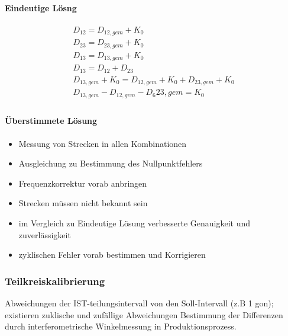 \documentclass[12pt]{article}
\begin{document}
\paragraph{Eindeutige Lösng}
\begin{gather*}
	D_{12} = D_{12,gem} + K_0 \\
	D_{23} = D_{23,gem} + K_0 \\
	D_{13} = D_{13,gem} + K_0 \\
	D_{13} = D_{12} + D_{23} \\
	D_{13,gem} + K_0 = D_{12,gem} + K_0 + D_{23,gem} + K_0 \\
	D_{13,gem} - D_{12,gem} - D_6{23,gem} = K_0 \\
\end{gather*}
\paragraph{Überstimmete Lösung}
\begin{itemize}
	\item Messung von Strecken in allen Kombinationen
	\item Ausgleichung zu Bestimmung des Nullpunktfehlers
	\item Frequenzkorrektur vorab anbringen
	\item Strecken müssen nicht bekannt sein
	\item im Vergleich zu Eindeutige Lösung verbesserte Genauigkeit und zuverlässigkeit
	\item zyklischen Fehler vorab bestimmen und Korrigieren
\end{itemize}
\subsubsection{Teilkreiskalibrierung}
Abweichungen der IST-teilungsintervall von den Soll-Intervall (z.B 1 gon); existieren zuklische und zufällige Abweichungen Bestimmung der Differenzen durch interferometrische Winkelmessung in Produktionsprozess. 
\subsection{}
\end{document}
